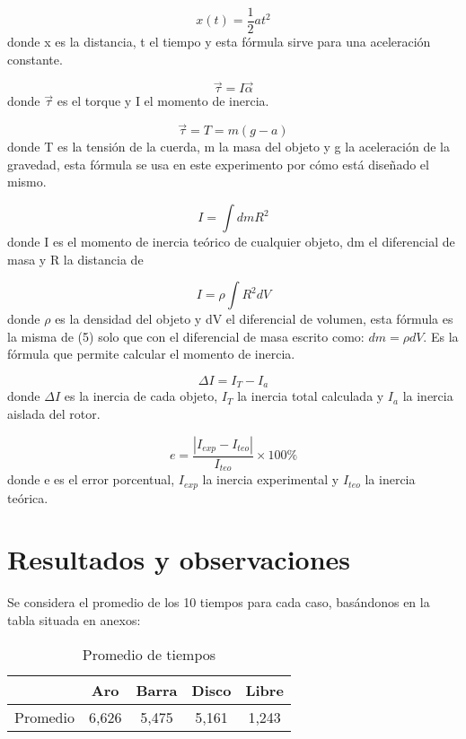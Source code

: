\documentclass[a4paper]{article}
\begin{document}
\begin{equation}
    x(t)=\frac{1}{2}at^2
\end{equation}
donde x es la distancia, t el tiempo y esta fórmula sirve para una aceleración constante.

\begin{equation}
    \Vec{\tau}=I\Vec{\alpha}
\end{equation}
donde $\Vec{\tau}$ es el torque y I el momento de inercia.

\begin{equation}
   \Vec{\tau}=T=m(g-a)
\end{equation}
donde T es la tensión de la cuerda, m la masa del objeto y g la aceleración de la gravedad, esta fórmula se usa en este experimento por cómo está diseñado el mismo.

\begin{equation}
    I=\int dm R^2
\end{equation}
donde I es el momento de inercia teórico de cualquier objeto, dm el diferencial de masa y R la distancia de

\begin{equation}
    I=\rho \int R^2dV
\end{equation}
donde $\rho$ es la densidad del objeto y dV el diferencial de volumen, esta fórmula es la misma de (5) solo que con el diferencial de masa escrito como: $dm=\rho dV$. Es la fórmula que permite calcular el momento de inercia.

\begin{equation}
    \Delta I=I_T-I_a
\end{equation}
donde $\Delta I$ es la inercia de cada objeto, $I_T$ la inercia total calculada y $I_a$ la inercia aislada del rotor.

\begin{equation}
    e=\frac{|I_{exp}-I_{teo}|}{I_{teo}}\times 100\%
\end{equation}
donde e es el error porcentual, $I_{exp}$ la inercia experimental y $I_{teo}$ la inercia teórica.

\section{Resultados y observaciones}

Se considera el promedio de los 10 tiempos para cada caso, basándonos en la tabla situada en anexos:

\begin{table}[H]
    \centering
    \begin{tabular}{|c|c|c|c|c|}
    \hline
        ~ & Aro & Barra & Disco & Libre  \\ \hline
        Promedio & 6,626 & 5,475 & 5,161 & 1,243  \\ \hline
    \end{tabular}
    \caption{Promedio de tiempos}
\end{table}
\end{document}

